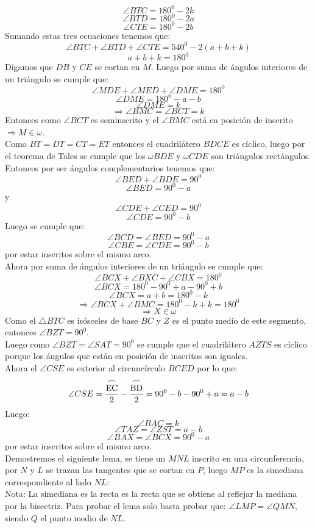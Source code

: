 \documentclass{book}
\begin{document}
\begin{enumerate}
$$\angle BTC=180^0-2k$$
$$\angle BTD=180^0-2a$$
$$\angle CTE=180^0-2b$$
Sumando estas tres ecuaciones tenemos que:
$$\angle BTC+\angle BTD+\angle CTE=540^0-2(a+b+k)$$
$$a+b+k=180^0$$
Digamos que $DB$ y $CE$ se cortan en $M$. Luego por suma de ángulos interiores de un triángulo se cumple que:
$$\angle MDE+\angle MED+\angle DME=180^0$$
$$\angle DME=180^0-a-b$$
$$\angle DME=k$$
$$\Rightarrow\angle BMC=\angle BCT=k$$
Entonces como $\angle BCT$ es seminscrito y el $\angle BMC$ está en posición de inscrito $\Rightarrow M\in\omega$.\\
Como $BT=DT=CT=ET$ entonces el cuadrilátero $BDCE$ es cíclico, luego por el teorema de Tales se cumple que los $\omega BDE$ y $\omega CDE$ son triángulos rectángulos.\\
Entonces por ser ángulos complementarios tenemos que:
$$\angle BED+\angle BDE=90^0$$
$$\angle BED=90^0-a$$
y
$$\angle CDE+\angle CED=90^0$$
$$\angle CDE=90^0-b$$
Luego se cumple que:
$$\angle BCD=\angle BED=90^0-a$$
$$\angle CBE=\angle CDE=90^0-b$$
por estar inscritos sobre el mismo arco.\\
Ahora por suma de ángulos interiores de un triángulo se cumple que:
$$\angle BCX+\angle BXC+\angle CBX=180^0$$
$$\angle BCX=180^0-90^0+a-90^0+b$$
$$\angle BCX=a+b=180^0-k$$
$$\Rightarrow\angle BCX+\angle BMC=180^0-k+k=180^0$$
$$\Rightarrow X\in\omega$$
Como el $\triangle BTC$ es isósceles de base $BC$ y $Z$ es el punto medio de este segmento, entonces $\angle BZT=90^0$.\\
Luego como $\angle BZT=\angle SAT=90^0$ se cumple que el cuadrilátero $AZTS$ es cíclico porque los ángulos que están en posición de inscritos son iguales.\\
Ahora el $\angle CSE$ es exterior al circuncírculo $BCED$ por lo que:
$$\angle CSE={\stackrel{\textstyle\frown}{\mathrm{EC}}\over 2}-{\stackrel{\textstyle\frown}{\mathrm{BD}}\over 2}=90^0-b-90^0+a=a-b$$
Luego:
$$\angle BAC=k$$
$$\angle TAZ=\angle ZST=a-b$$
$$\angle BAX=\angle BCX=90^0-a$$
por estar inscritos sobre el mismo arco.\\
Demostremos el siguiente lema, se tiene un $MNL$ inscrito en una circunferencia, por $N$ y $L$ se trazan las tangentes que se cortan en $P$, luego $MP$ es la simediana correspondiente al lado $NL$:\\
Nota: La simediana es la recta es la recta que se obtiene al reflejar la mediana por la bisectriz.
Para probar el lema solo basta probar que: $\angle LMP=\angle QMN$, siendo $Q$ el punto medio de $NL$.

\end{enumerate}
\end{document}
